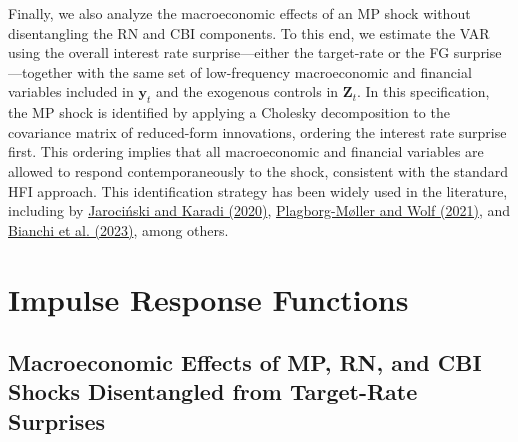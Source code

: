 \documentclass[12pt, reqno]{article}
\begin{document}
Finally, we also analyze the macroeconomic effects of an MP shock without disentangling the RN and CBI components. To this end, we estimate the VAR using the overall interest rate surprise—either the target-rate or the FG surprise—together with the same set of low-frequency macroeconomic and financial variables included in $\boldsymbol{y}_t$ and the exogenous controls in $\boldsymbol{Z}_t$. In this specification, the MP shock is identified by applying a Cholesky decomposition to the covariance matrix of reduced-form innovations, ordering the interest rate surprise first. This ordering implies that all macroeconomic and financial variables are allowed to respond contemporaneously to the shock, consistent with the standard HFI approach. This identification strategy has been widely used in the literature, including by \hyperlink{JK (2020)}{Jarociński and Karadi (2020)}, \hyperlink{Plagborg-Møller and Wolf (2021)}{Plagborg-Møller and Wolf (2021)}, and \hyperlink{Bianchi et al. (2023)}{Bianchi et al. (2023)}, among others.


\section{Impulse Response Functions}
\hypertarget{Section 5}{}

\subsection{Macroeconomic Effects of MP, RN, and CBI Shocks Disentangled from Target-Rate Surprises}
\end{document}
